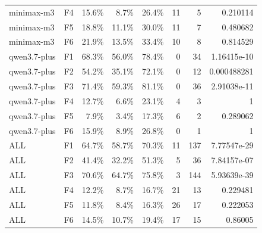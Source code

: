 \begin{tabular}{llrrrrrr}
minimax-m3 & F4 & 15.6\% & 8.7\% & 26.4\% & 11 & 5 & 0.210114 \\
minimax-m3 & F5 & 18.8\% & 11.1\% & 30.0\% & 11 & 7 & 0.480682 \\
minimax-m3 & F6 & 21.9\% & 13.5\% & 33.4\% & 10 & 8 & 0.814529 \\
qwen3.7-plus & F1 & 68.3\% & 56.0\% & 78.4\% & 0 & 34 & 1.16415e-10 \\
qwen3.7-plus & F2 & 54.2\% & 35.1\% & 72.1\% & 0 & 12 & 0.000488281 \\
qwen3.7-plus & F3 & 71.4\% & 59.3\% & 81.1\% & 0 & 36 & 2.91038e-11 \\
qwen3.7-plus & F4 & 12.7\% & 6.6\% & 23.1\% & 4 & 3 & 1 \\
qwen3.7-plus & F5 & 7.9\% & 3.4\% & 17.3\% & 6 & 2 & 0.289062 \\
qwen3.7-plus & F6 & 15.9\% & 8.9\% & 26.8\% & 0 & 1 & 1 \\
ALL & F1 & 64.7\% & 58.7\% & 70.3\% & 11 & 137 & 7.77547e-29 \\
ALL & F2 & 41.4\% & 32.2\% & 51.3\% & 5 & 36 & 7.84157e-07 \\
ALL & F3 & 70.6\% & 64.7\% & 75.8\% & 3 & 144 & 5.93639e-39 \\
ALL & F4 & 12.2\% & 8.7\% & 16.7\% & 21 & 13 & 0.229481 \\
ALL & F5 & 11.8\% & 8.4\% & 16.3\% & 26 & 17 & 0.222053 \\
ALL & F6 & 14.5\% & 10.7\% & 19.4\% & 17 & 15 & 0.86005 \\
\bottomrule
\end{tabular}

